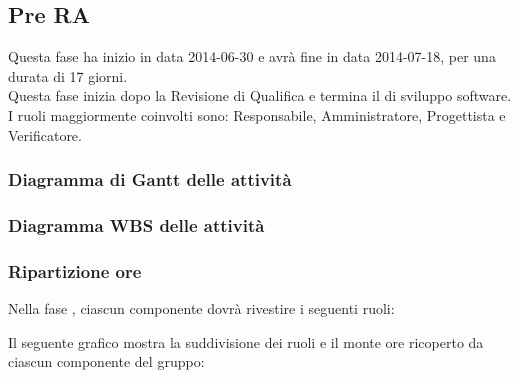 \subsection{Pre RA}
Questa fase ha inizio in data 2014-06-30 e avrà fine in data 2014-07-18, per una durata di 17 giorni.\\
Questa fase inizia dopo la Revisione di Qualifica e termina il  di sviluppo software.\\
I ruoli maggiormente coinvolti sono: Responsabile, Amministratore, Progettista e Verificatore.


\subsubsection{Diagramma di Gantt delle attività}

\newpage
\subsubsection{Diagramma WBS delle attività}

\newpage
\subsubsection{Ripartizione ore}

\newpage
Nella fase , ciascun componente dovrà rivestire i seguenti ruoli:

Il seguente grafico mostra la suddivisione dei ruoli e il monte ore ricoperto da ciascun componente del gruppo:
